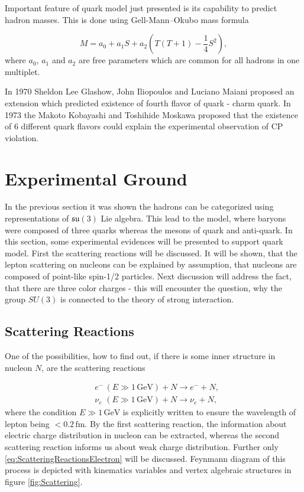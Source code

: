 \documentclass[a4paper,11pt]{report}
\newcommand{\GeV}{\,\text{GeV}}
\begin{document}
Important feature of quark model just presented is its capability to predict
hadron masses. This is done using Gell-Mann--Okubo mass formula
\cite{Gell-Mann:1250016,Okubo01051962}

\begin{equation}
  M = a_0 + a_1 S + a_2 \left( T(T+1) - \frac{1}{4}S^2 \right),
  \label{eq:GellMannOkubo}
\end{equation}
where $a_0$, $a_1$ and $a_2$ are free parameters which are common for all
hadrons in one multiplet. 

In 1970 Sheldon Lee Glashow, John Iliopoulos and Luciano Maiani proposed
\cite{Quarks4} an extension which predicted existence of fourth flavor of quark
- charm quark.
In 1973 the Makoto Kobayashi and Toshihide Moskawa proposed \cite{Quarks6} that the
existence of 6 different quark flavors could explain the experimental
observation of CP violation.



\section{Experimental Ground}

In the previous section it was shown the hadrons can be categorized using
representations of $\mathfrak{su}(3)$ Lie algebra. This lead to the model, where
baryons were composed of three quarks whereas the mesons of quark and
anti-quark. In this section, some experimental evidences will be presented to
support quark model. First the scattering reactions will be discussed. It will
be shown, that the lepton scattering on nucleons can be explained by assumption,
that nucleons are composed of point-like spin-1/2 particles. Next discussion
will address the fact, that there are three color charges - this will encounter
the question, why the group $SU(3)$ is connected to the theory of strong
interaction.

\subsection{Scattering Reactions}

One of the possibilities, how to find out, if there is some inner structure in
nucleon $N$, are the scattering reactions

\begin{align}
  &e^- \, (E \gg 1\GeV) + N \rightarrow e^- + N,
  \label{eq:ScatteringReactionsElectron} \\
  &\nu_e \,\, (E \gg 1\GeV) + N \rightarrow \nu_e + N,
  \label{eq:ScatteringReactionsNeutrino}
\end{align}
where the condition $E \gg 1 \GeV$ is explicitly written to ensure the wavelength
of lepton being $< 0.2\,\text{fm}$. By the first scattering reaction, the information
about electric charge distribution in nucleon can be extracted, whereas the
second scattering reaction informs us about weak charge distribution. Further only
\eqref{eq:ScatteringReactionsElectron} will be discussed. Feynmann diagram of this
process is depicted with kinematics variables and vertex algebraic structures 
in figure \ref{fig:Scattering}. 
\end{document}
